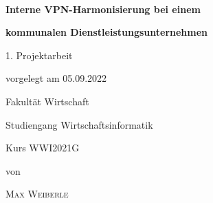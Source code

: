 \newcommand{\typMeinerArbeit}{1. Projektarbeit}

\newcommand{\themaMeinerArbeit}{Interne VPN-Harmonisierung bei einem kommunalen Dienstleistungsunternehmen}

\newcommand{\meinName}{Max Weiberle}

\thispagestyle{empty}

\begin{spacing}{1}
	\begin{center}
		~\vspace{0mm}

		{\sffamily
			\LARGE
			\textbf{Interne VPN-Harmonisierung bei einem}

			\bigskip
			\textbf{kommunalen Dienstleistungsunternehmen}
		}


		\vspace{15mm}

		{\Large \typMeinerArbeit}

		\vspace{1cm}

		vorgelegt am 05.09.2022

		\vspace{15mm}

		Fakultät Wirtschaft
		\medskip

		Studiengang Wirtschaftsinformatik
		\medskip

		Kurs WWI2021G

		\vspace{10mm}

		von

		\vspace{10mm}

		{\large\textsc{\meinName}}

		\vspace{10mm}
	\end{center}


\end{spacing}
